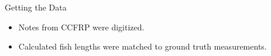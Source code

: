 




\begin{frame}{Getting the Data}
    \begin{itemize}
        \item Notes from CCFRP were digitized.
        \item Calculated fish lengths were matched to ground truth measurements.
    \end{itemize}
\end{frame}

